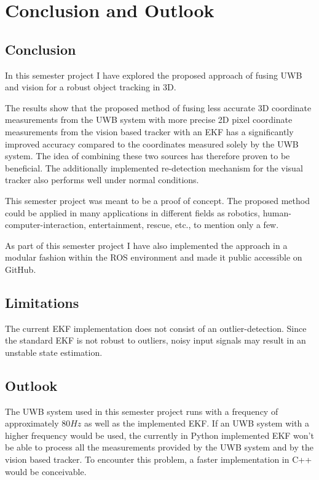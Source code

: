 \chapter{Conclusion and Outlook}

\section{Conclusion}
In this semester project I have explored the proposed approach of fusing \ac{UWB} and vision for a robust object tracking in 3D.

The results show that the proposed method of fusing less accurate 3D coordinate measurements from the \ac{UWB} system with more precise 2D pixel coordinate measurements from the vision based tracker with an \acf{EKF} has a significantly improved accuracy compared to the coordinates measured solely by the \ac{UWB} system. The idea of combining these two sources has therefore proven to be beneficial. The additionally implemented re-detection mechanism for the visual tracker also performs well under normal conditions.

This semester project was meant to be a proof of concept. The proposed method could be applied in many applications in different fields as robotics, human-computer-interaction, entertainment, rescue, etc., to mention only a few.

As part of this semester project I have also implemented the approach in a modular fashion within the \ac{ROS} environment and made it public accessible on GitHub\cite{Ziegler:2016}.

\section{Limitations}
The current \ac{EKF} implementation does not consist of an outlier-detection. Since the standard \ac{EKF} is not robust to outliers, noisy input signals may result in an unstable state estimation. 


\section{Outlook}
The \ac{UWB} system used in this semester project runs with a frequency of approximately $80\mathit{Hz}$ as well as the implemented \ac{EKF}. If an \ac{UWB} system with a higher frequency would be used, the currently in Python implemented \ac{EKF} won't be able to process all the measurements provided by the \ac{UWB} system and by the vision based tracker. To encounter this problem, a faster implementation in C++ would be conceivable.

